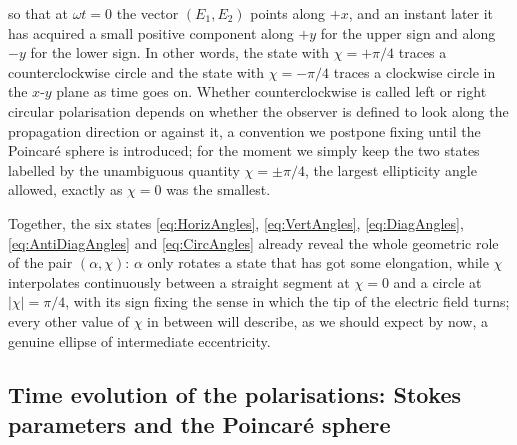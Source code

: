             so that at $\omega t=0$ the vector $(E_1,E_2)$ points along $+x$, and an instant later it has acquired a small positive component along $+y$ for the upper sign and along $-y$ for the lower sign. In other words, the state with $\chi=+\pi/4$ traces a counterclockwise circle and the state with $\chi=-\pi/4$ traces a clockwise circle in the $x$-$y$ plane as time goes on. Whether counterclockwise is called left or right circular polarisation depends on whether the observer is defined to look along the propagation direction or against it, a convention we postpone fixing until the Poincaré sphere is introduced; for the moment we simply keep the two states labelled by the unambiguous quantity $\chi=\pm\pi/4$, the largest ellipticity angle allowed, exactly as $\chi=0$ was the smallest.

            Together, the six states \ref{eq:HorizAngles}, \ref{eq:VertAngles}, \ref{eq:DiagAngles}, \ref{eq:AntiDiagAngles} and \ref{eq:CircAngles} already reveal the whole geometric role of the pair $(\alpha,\chi)$: $\alpha$ only rotates a state that has got some elongation, while $\chi$ interpolates continuously between a straight segment at $\chi=0$ and a circle at $|\chi|=\pi/4$, with its sign fixing the sense in which the tip of the electric field turns; every other value of $\chi$ in between will describe, as we should expect by now, a genuine ellipse of intermediate eccentricity.

    \subsection{Time evolution of the polarisations: Stokes parameters and the Poincaré sphere}

